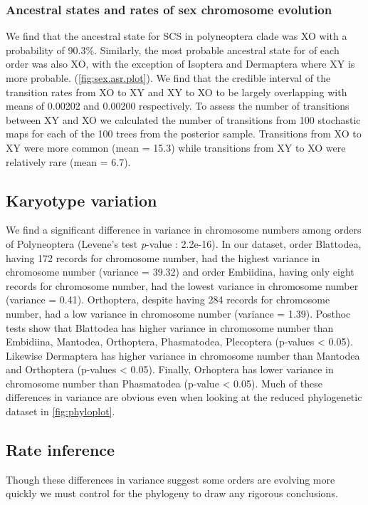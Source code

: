 \subsubsection{Ancestral states and rates of sex chromosome evolution}

We find that the ancestral state for SCS in polyneoptera clade was XO with a probability of 90.3\%.
Similarly, the most probable ancestral state for of each order was also XO, with the exception of Isoptera and Dermaptera where XY is more probable.
(\cref{fig:sex.asr.plot}).
We find that the credible interval of the transition rates from XO to XY and XY to XO to be largely overlapping with means of 0.00202 and 0.00200 respectively. 
To assess the number of transitions between XY and XO we calculated the number of transitions from 100 stochastic maps for each of the 100 trees from the posterior sample.
Transitions from XO to XY were more common (mean = 15.3) while transitions from XY to XO were relatively rare (mean = 6.7).

\subsection{Karyotype variation}
We find a significant difference in variance in chromosome numbers among orders of Polyneoptera (Levene's test \textit{p}-value : 2.2e-16). %
In our dataset, order Blattodea, having 172 records for chromosome number, had the highest variance in chromosome number (variance = 39.32) and order Embiidina, having only eight records for chromosome number, had the lowest variance in chromosome number (variance = 0.41).
Orthoptera, despite having 284 records for chromosome number, had a low variance in chromosome number (variance = 1.39). 
Posthoc tests show that Blattodea has higher variance in chromosome number than Embidiina, Mantodea, Orthoptera, Phasmatodea, Plecoptera (p-values < 0.05). 
Likewise Dermaptera has higher variance in chromosome number than Mantodea and Orthoptera (p-values < 0.05). 
Finally, Orhoptera has lower variance in chromosome number than Phasmatodea (p-value < 0.05).
Much of these differences in variance are obvious even when looking at the reduced phylogenetic dataset in \cref{fig:phyloplot}.

\subsection{Rate inference}
Though these differences in variance suggest some orders are evolving more quickly we must control for the phylogeny to draw any rigorous conclusions.

